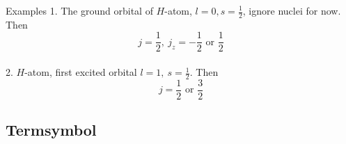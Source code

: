 \documentclass[UTF8,12pt]{article} %
\numberwithin{equation}{section}
\begin{document}
\begin{myboxes}{Examples}{}
1. The ground orbital of $H$-atom, $l=0, s=\frac{1}{2}$, ignore nuclei for now. Then
$$j = \frac{1}{2},~ j_{z} = -\frac{1}{2} \text{ or } \frac{1}{2}$$\\
2. $H$-atom, first excited orbital $l=1,~ s=\frac{1}{2}$. Then
$$j = \frac{1}{2} \text{ or } \frac{3}{2}$$
\end{myboxes}

\subsection{Termsymbol}
\end{document}
